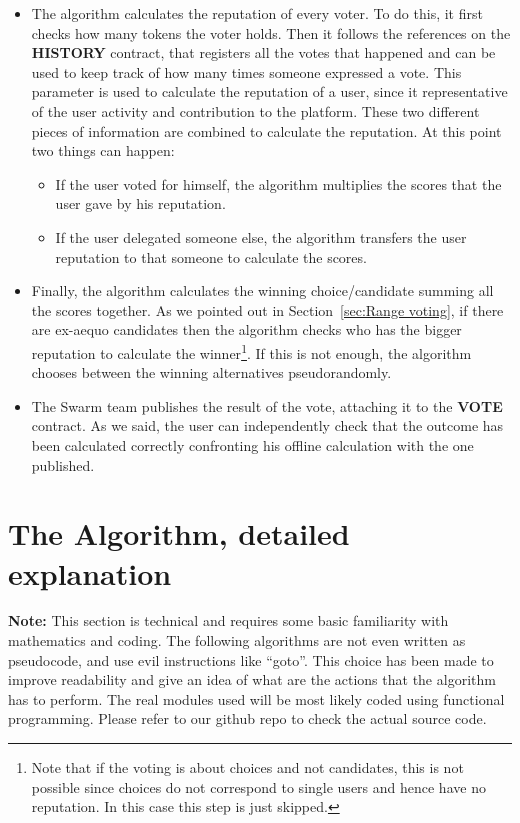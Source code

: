 \documentclass[submission, copyright,creativecommons,sharealike,noncommercial]{eptcs}
\newcommand{\Vote}{\textbf{VOTE}\xspace}
\newcommand{\History}{\textbf{HISTORY}\xspace}
\begin{document}
\begin{itemize}
			\item The algorithm calculates the reputation of every voter. To do this, it first checks how many tokens the voter holds. Then it follows the references on the \History contract, that registers all the votes that happened and can be used to keep track of how many times someone expressed a vote. This parameter is used to calculate the reputation of a user, since it representative of the user activity and contribution to the platform.
			These two different pieces of information are combined to calculate the reputation. At this point two things can happen:
			\begin{itemize}
				\item If the user voted for himself, the algorithm multiplies the scores that the user gave by his reputation.
				
				\item If the user delegated someone else, the algorithm transfers the user reputation to that someone to calculate the scores.
			\end{itemize}
			\item Finally, the algorithm calculates the winning choice/candidate summing all the scores together. As we pointed out in Section~\ref{sec:Range voting}, if there are ex-aequo candidates then the algorithm checks who has the bigger reputation to calculate the winner\footnote{Note that if the voting is about choices and not candidates, this is not possible since choices do not correspond to single users and hence have no reputation. In this case this step is just skipped.}. If this is not enough, the algorithm chooses between the winning alternatives pseudorandomly.
			
			\item The Swarm team publishes the result of the vote, attaching it to the \Vote contract. As we said, the user can independently check that the outcome has been calculated correctly confronting his offline calculation with the one published.
		\end{itemize}
%
%
\section{The Algorithm, detailed explanation}\label{sec:Algorithm technical explanation}
%
	\textbf{Note:} This section is technical and requires some basic familiarity with mathematics and coding. The following algorithms are not even written as pseudocode, and use evil instructions like ``goto''. This choice has been made to improve readability and give an idea of what are the actions that the algorithm has to perform. The real modules used will be most likely coded using functional programming. Please refer to our github repo to check the actual source code.
%
%
\end{document}
